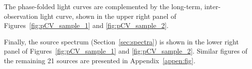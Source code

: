 \documentclass[fleqn,usenatbib]{mnras}
\begin{document}
The phase-folded light curves are complemented by the long-term, inter-observation light curve, shown in the upper right panel of Figures~\ref{fig:pCV_sample_1} and \ref{fig:pCV_sample_2}. 

Finally, the source spectrum (Section~\ref{sec:spectra})
is shown in the lower right panel of Figures~\ref{fig:pCV_sample_1} and \ref{fig:pCV_sample_2}. 
Similar figures of the remaining 21 sources are presented in Appendix~\ref{appen:fig}.

\end{document}
